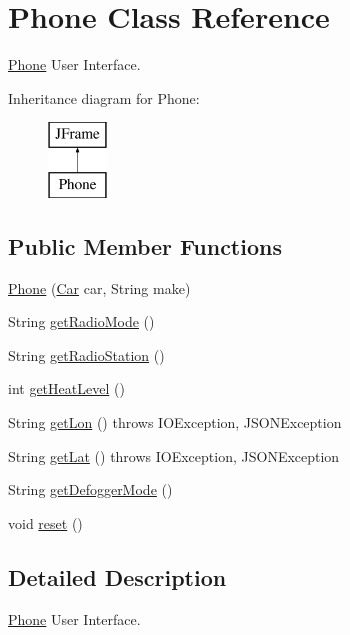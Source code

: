\hypertarget{class_phone}{}\section{Phone Class Reference}
\label{class_phone}


\hyperlink{class_phone}{Phone} User Interface.  


Inheritance diagram for Phone\+:\begin{figure}[H]
\begin{center}
\leavevmode
\includegraphics[height=2.000000cm]{class_phone}
\end{center}
\end{figure}
\subsection*{Public Member Functions}
\begin{DoxyCompactItemize}
\item 
\hyperlink{class_phone_a167a2a5477086111ce6ca7ee2eedfc7d}{Phone} (\hyperlink{class_car}{Car} car, String make)
\item 
String \hyperlink{class_phone_a50afb918072dab2f9644c9e55c96c452}{get\+Radio\+Mode} ()
\item 
String \hyperlink{class_phone_aef3d6a3495f6c550945ad804bae270c2}{get\+Radio\+Station} ()
\item 
int \hyperlink{class_phone_af4ea813ece73a247d88c9fbf151ff4bd}{get\+Heat\+Level} ()
\item 
String \hyperlink{class_phone_a154cf84b19a3b54d2e4cc08fcd1d702b}{get\+Lon} ()  throws I\+O\+Exception, J\+S\+O\+N\+Exception 
\item 
String \hyperlink{class_phone_acbf85bf867e7ac27b4cf1af2cd393d27}{get\+Lat} ()  throws I\+O\+Exception, J\+S\+O\+N\+Exception 
\item 
String \hyperlink{class_phone_ab4c0de3a5156fddc285fd9e4c6e065da}{get\+Defogger\+Mode} ()
\item 
void \hyperlink{class_phone_a68bcf4d66dd5d72b47521be9e3e99b57}{reset} ()
\end{DoxyCompactItemize}


\subsection{Detailed Description}
\hyperlink{class_phone}{Phone} User Interface. 

